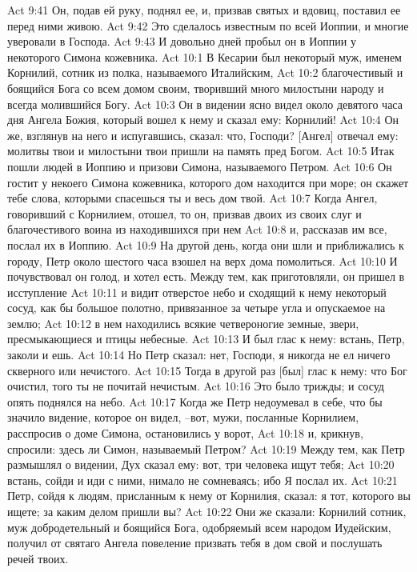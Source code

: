 Act 9:41  Он, подав ей руку, поднял ее, и, призвав святых и вдовиц, поставил ее перед ними живою.
Act 9:42  Это сделалось известным по всей Иоппии, и многие уверовали в Господа.
Act 9:43  И довольно дней пробыл он в Иоппии у некоторого Симона кожевника.
Act 10:1  В Кесарии был некоторый муж, именем Корнилий, сотник из полка, называемого Италийским,
Act 10:2  благочестивый и боящийся Бога со всем домом своим, творивший много милостыни народу и всегда молившийся Богу.
Act 10:3  Он в видении ясно видел около девятого часа дня Ангела Божия, который вошел к нему и сказал ему: Корнилий!
Act 10:4  Он же, взглянув на него и испугавшись, сказал: что, Господи? [Ангел] отвечал ему: молитвы твои и милостыни твои пришли на память пред Богом.
Act 10:5  Итак пошли людей в Иоппию и призови Симона, называемого Петром.
Act 10:6  Он гостит у некоего Симона кожевника, которого дом находится при море; он скажет тебе слова, которыми спасешься ты и весь дом твой.
Act 10:7  Когда Ангел, говоривший с Корнилием, отошел, то он, призвав двоих из своих слуг и благочестивого воина из находившихся при нем
Act 10:8  и, рассказав им все, послал их в Иоппию.
Act 10:9  На другой день, когда они шли и приближались к городу, Петр около шестого часа взошел на верх дома помолиться.
Act 10:10  И почувствовал он голод, и хотел есть. Между тем, как приготовляли, он пришел в исступление
Act 10:11  и видит отверстое небо и сходящий к нему некоторый сосуд, как бы большое полотно, привязанное за четыре угла и опускаемое на землю;
Act 10:12  в нем находились всякие четвероногие земные, звери, пресмыкающиеся и птицы небесные.
Act 10:13  И был глас к нему: встань, Петр, заколи и ешь.
Act 10:14  Но Петр сказал: нет, Господи, я никогда не ел ничего скверного или нечистого.
Act 10:15  Тогда в другой раз [был] глас к нему: что Бог очистил, того ты не почитай нечистым.
Act 10:16  Это было трижды; и сосуд опять поднялся на небо.
Act 10:17  Когда же Петр недоумевал в себе, что бы значило видение, которое он видел, --вот, мужи, посланные Корнилием, расспросив о доме Симона, остановились у ворот,
Act 10:18  и, крикнув, спросили: здесь ли Симон, называемый Петром?
Act 10:19  Между тем, как Петр размышлял о видении, Дух сказал ему: вот, три человека ищут тебя;
Act 10:20  встань, сойди и иди с ними, нимало не сомневаясь; ибо Я послал их.
Act 10:21  Петр, сойдя к людям, присланным к нему от Корнилия, сказал: я тот, которого вы ищете; за каким делом пришли вы?
Act 10:22  Они же сказали: Корнилий сотник, муж добродетельный и боящийся Бога, одобряемый всем народом Иудейским, получил от святаго Ангела повеление призвать тебя в дом свой и послушать речей твоих.
